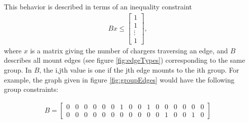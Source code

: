 This behavior is described in terms of an inequality constraint
\begin{align}
	Bx \le \begin{bmatrix} 1\\ 1 \\\vdots \\ 1\end{bmatrix},
\end{align}
where $x$ is a matrix giving the number of chargers traversing an edge, and $B$ describes all mount edges (see figure \ref{fig:edgeTypes}) corresponding to the same group. In $B$, the i,jth value is one if the jth edge mounts to the ith group.  For example, the graph given in figure \ref{fig:groupEdges} would have the following group constraints:

\begin{align}
	B = \begin{bmatrix}0 & 0 & 0 & 0 & 0 & 0 & 1 & 0 & 0 & 1 & 0 & 0 & 0 & 0 & 0 & 0\\
	                   0 & 0 & 0 & 0 & 0 & 0 & 0 & 0 & 0 & 0 & 0 & 1 & 0 & 0 & 1 & 0\end{bmatrix}
\end{align}

